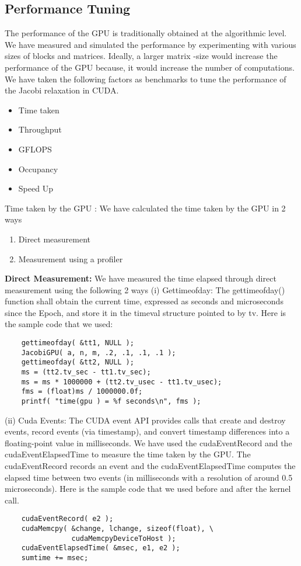 \documentclass[11pt, twocolumn]{article}
\begin{document}
    \subsection{Performance Tuning}
    The performance of the GPU is traditionally obtained at the algorithmic level.
    We have measured and simulated the performance by experimenting with various sizes of blocks and matrices.
    Ideally, a larger matrix -size would increase the performance of the GPU because,  it would increase  the  number of computations.
    We have taken the following factors as benchmarks to tune the performance of the Jacobi relaxation in CUDA.
\begin{itemize}
    \item Time taken
    \item Throughput
    \item GFLOPS
    \item Occupancy
    \item Speed Up
\end{itemize}
    Time taken by the GPU  : We have calculated the time taken by the GPU in 2 ways
    \begin{enumerate}
        \item Direct measurement
        \item Measurement using a profiler
    \end{enumerate}

    {\bf Direct Measurement:} We have measured the time elapsed through direct measurement using the   following  2 ways
    (i)     Gettimeofday: The gettimeofday() function shall obtain the current time, expressed as seconds and microseconds since the Epoch, and store it in the timeval structure pointed to by tv.
            Here is the sample code that we used:
    \begin{tiny}
    \begin{verbatim}
    gettimeofday( &tt1, NULL );
    JacobiGPU( a, n, m, .2, .1, .1, .1 );
    gettimeofday( &tt2, NULL );
    ms = (tt2.tv_sec - tt1.tv_sec);
    ms = ms * 1000000 + (tt2.tv_usec - tt1.tv_usec);
    fms = (float)ms / 1000000.0f;
    printf( "time(gpu ) = %f seconds\n", fms );
    \end{verbatim}
    \end{tiny}

    (ii)    Cuda Events: The CUDA event API provides calls that create and destroy events, record events (via timestamp), and convert timestamp differences into a floating-point value in milliseconds. We have used the cudaEventRecord and the cudaEventElapsedTime to  measure the time taken by the GPU. The cudaEventRecord records an event and the cudaEventElapsedTime  computes the elapsed time between two events (in milliseconds with a resolution of around 0.5 microseconds). Here is the sample code that we used before and after the kernel call. 
    \begin{tiny}
    \begin{verbatim}
    cudaEventRecord( e2 );
    cudaMemcpy( &change, lchange, sizeof(float), \ 
                cudaMemcpyDeviceToHost );
    cudaEventElapsedTime( &msec, e1, e2 );
    sumtime += msec;
    \end{verbatim}
    \end{tiny}
\end{document}
